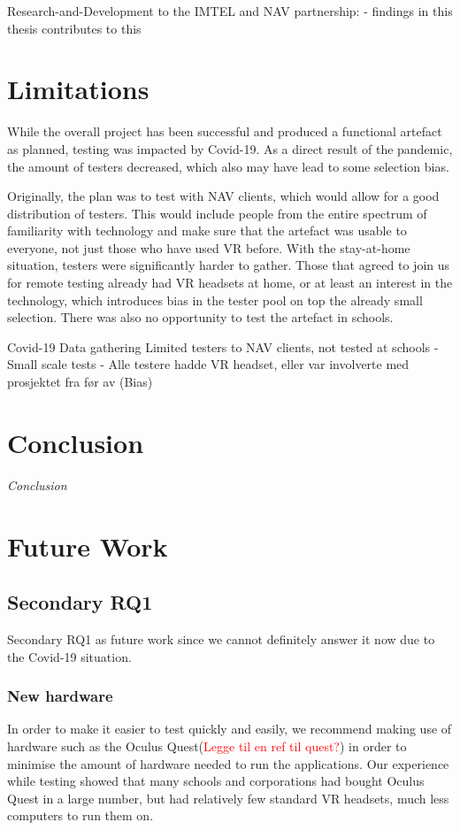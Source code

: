 Research-and-Development to the IMTEL and NAV partnership:
- findings in this thesis contributes to this


\section{Limitations}
While the overall project has been successful and produced a functional artefact as planned, testing was impacted by Covid-19. As a direct result of the pandemic, the amount of testers decreased, which also may have lead to some selection bias.

Originally, the plan was to test with NAV clients, which would allow for a good distribution of testers. This would include people from the entire spectrum of familiarity with technology and make sure that the artefact was usable to everyone, not just those who have used VR before. With the stay-at-home situation, testers were significantly harder to gather. Those that agreed to join us for remote testing already had VR headsets at home, or at least an interest in the technology, which introduces bias in the tester pool on top the already small selection. There was also no opportunity to test the artefact in schools.

Covid-19
Data gathering
Limited testers to NAV clients, not tested at schools
- Small scale tests
- Alle testere hadde VR headset, eller var involverte med prosjektet fra før av (Bias)





\section{Conclusion}
\textit{Conclusion}

\section{Future Work}
\label{section:futureWork}

\subsection{Secondary RQ1}
Secondary RQ1 as future work since we cannot definitely answer it now due to the Covid-19 situation.


\subsubsection{New hardware}
In order to make it easier to test quickly and easily, we recommend making use of hardware such as the Oculus Quest(\textcolor{red}{Legge til en ref til quest?}) in order to minimise the amount of hardware needed to run the applications. Our experience while testing showed that many schools and corporations had bought Oculus Quest in a large number, but had relatively few standard VR headsets, much less computers to run them on. 

